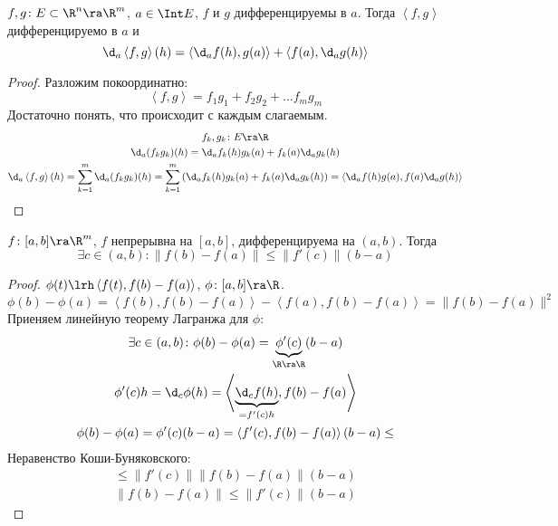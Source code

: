 \begin{theorem}
	$f, g\colon E \subset \R^n \ra \R^m$, $a \in \Int E$, $f$ и $g$ дифференцируемы в $a$.
	Тогда $\left<f, g\right>$ дифференцируемо в $a$ и
	\[ \d_a \left<f, g\right>(h) = \left<\d_a f(h), g(a)\right> + \left<f(a), \d_a g(h)\right>\]
\end{theorem}
\begin{proof}
	Разложим покоординатно:
	\[ \left<f, g\right> = f_1 g_1 + f_2 g_2 + \dots f_m g_m \]
	Достаточно понять, что происходит с каждым слагаемым.
	\begin{gather*}
		f_k, g_k\colon E \ra \R \\
		\d_a (f_k g_k)(h) = \d_a f_k(h) g_k(a) + f_k(a) \d_a g_k(h) \\
		\d_a \left<f, g\right>(h) = \sum_{k=1}^m \d_a (f_k g_k)(h) = \sum_{k=1}^m \left(\d_a f_k(h) g_k(a) + f_k(a) \d_a g_k(h)\right) =
			\left<\d_a f(h) g(a), f(a) \d_a g(h)\right>
	\end{gather*}
\end{proof}

\begin{theorem}
	$f\colon [a, b] \ra \R^m$, $f$ непрерывна на $[a, b]$, дифференцируема на $(a, b)$.
	Тогда
	\[ \exists c \in (a, b)\colon \|f(b) - f(a)\| \le \|f'(c)\| (b - a) \]
\end{theorem}
\begin{proof}
	$\phi(t) \lrh \left< f(t), f(b) - f(a) \right>$, $\phi\colon [a, b] \ra \R$.
	\[ \phi(b) - \phi(a) = \left< f(b), f(b) - f(a) \right> - \left< f(a), f(b) - f(a) \right> = \|f(b) - f(a)\|^2 \]
	Приеняем линейную теорему Лагранжа для $\phi$:
	\begin{gather*}
		\exists c\in(a, b)\colon \phi(b) - \phi(a) = \underbrace{\phi'(c)}_{\R \ra \R}(b - a) \\
		\phi'(c) h = \d_c \phi(h) = \left<\underbrace{\d_c f(h)}_{=f'(c)h}, f(b) - f(a)\right> \\
		\phi(b) - \phi(a) = \phi'(c)(b - a) = \left<f'(c), f(b) - f(a)\right>(b-a) \le
	\end{gather*}
	Неравенство Коши-Буняковского:
	\begin{gather*}
		\le \|f'(c)\| \|f(b) - f(a)\| (b - a) \\
		\|f(b) - f(a)\| \le \|f'(c)\| (b - a)
	\end{gather*}
\end{proof}
